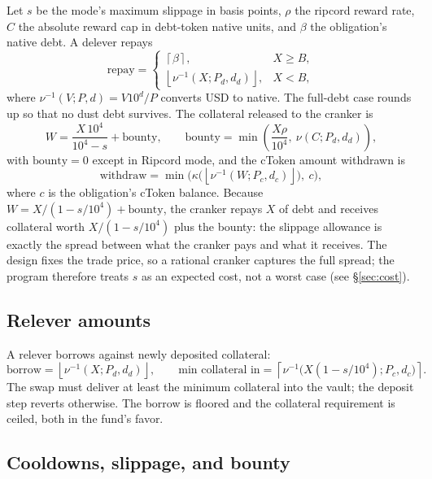 \documentclass[11pt]{article}
\theoremstyle{remark}
\newcommand{\fl}[1]{\left\lfloor #1 \right\rfloor}
\newcommand{\cl}[1]{\left\lceil #1 \right\rceil}
\newcommand{\BPS}{10^{4}}
\begin{document}
Let $s$ be the mode's maximum slippage in basis points, $\rho$ the ripcord reward rate, $C$ the absolute reward cap in debt-token native units, and $\beta$ the obligation's native debt. A delever repays
\begin{equation}
\text{repay} =
\begin{cases}
\cl{\beta}, & X \ge B,\\[2pt]
\fl{\nu^{-1}(X; P_d, d_d)}, & X < B,
\end{cases}
\label{eq:repay}
\end{equation}
where $\nu^{-1}(V;P,d) = V10^{d}/P$ converts USD to native. The full-debt case rounds up so that no dust debt survives. The collateral released to the cranker is
\begin{equation}
W = \frac{X\,\BPS}{\BPS - s} + \text{bounty},
\qquad
\text{bounty} = \min\!\left(\frac{X\rho}{\BPS},\ \nu(C; P_d, d_d)\right),
\label{eq:withdraw}
\end{equation}
with $\text{bounty} = 0$ except in Ripcord mode, and the cToken amount withdrawn is
\begin{equation}
\text{withdraw} = \min\bigl(\kappa\bigl(\fl{\nu^{-1}(W; P_c, d_c)}\bigr),\ c\bigr),
\label{eq:withdraw-ct}
\end{equation}
where $c$ is the obligation's cToken balance. Because $W = X/(1-s/10^4) + \text{bounty}$, the cranker repays $X$ of debt and receives collateral worth $X/(1-s/10^4)$ plus the bounty: the slippage allowance is exactly the spread between what the cranker pays and what it receives. The design fixes the trade price, so a rational cranker captures the full spread; the program therefore treats $s$ as an expected cost, not a worst case (see \S\ref{sec:cost}).

\subsection{Relever amounts}

A relever borrows against newly deposited collateral:
\begin{equation}
\text{borrow} = \fl{\nu^{-1}(X; P_d, d_d)},
\qquad
\text{min collateral in} = \cl{\nu^{-1}\bigl(X(1 - s/\BPS); P_c, d_c\bigr)}.
\label{eq:relever}
\end{equation}
The swap must deliver at least the minimum collateral into the vault; the deposit step reverts otherwise. The borrow is floored and the collateral requirement is ceiled, both in the fund's favor.

\subsection{Cooldowns, slippage, and bounty}
\end{document}
